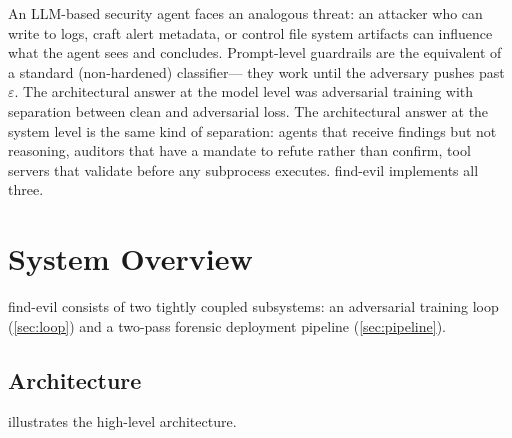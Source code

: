\documentclass[sigconf, nonacm]{acmart}
\begin{document}
An LLM-based security agent faces an analogous threat: an attacker
who can write to logs, craft alert metadata, or control file system
artifacts can influence what the agent sees and concludes. Prompt-level
guardrails are the equivalent of a standard (non-hardened) classifier---
they work until the adversary pushes past $\varepsilon$. The
architectural answer at the model level was adversarial training with
separation between clean and adversarial loss. The architectural answer
at the system level is the same kind of separation: agents that receive
findings but not reasoning, auditors that have a mandate to refute rather
than confirm, tool servers that validate before any subprocess executes.
find-evil implements all three.

\section{System Overview}
\label{sec:overview}

find-evil consists of two tightly coupled subsystems: an adversarial
training loop (\cref{sec:loop}) and a two-pass forensic deployment
pipeline (\cref{sec:pipeline}).

\subsection{Architecture}
\label{sec:arch}

 illustrates the high-level architecture.
\end{document}
